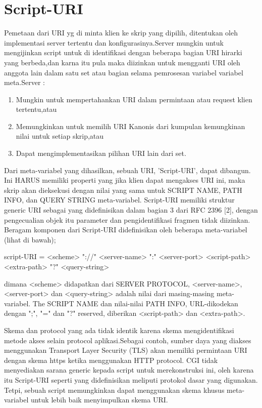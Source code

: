 \documentclass{article}
\begin{document}
\section{Script-URI}
Pemetaan dari URI yg di minta klien ke skrip yang dipilih, ditentukan oleh
implementasi server tertentu dan konfigurasinya.Server mungkin untuk mengijinkan script untuk di identifikasi dengan beberapa bagian URI hirarki yang berbeda,dan karna itu pula maka diizinkan untuk mengganti URI oleh anggota lain dalam satu set atau bagian selama pemrosesan variabel variabel meta.Server :
\begin{enumerate}
\item Mungkin untuk mempertahankan URI dalam permintaan atau request klien tertentu,atau
\item Memungkinkan untuk memilih URI Kanonis dari kumpulan kemungkinan nilai untuk setiap skrip,atau
\item Dapat mengimplementasikan pilihan URI lain dari set.
\end{enumerate}
Dari meta-variabel yang dihasilkan, sebuah URI, 'Script-URI', dapat
dibangun. Ini HARUS memiliki properti yang jika klien dapat
mengakses URI ini, maka skrip akan dieksekusi
dengan nilai yang sama untuk SCRIPT NAME, PATH INFO, dan QUERY STRING
meta-variabel. Script-URI memiliki struktur generic URI sebagai yang
didefinisikan dalam bagian 3 dari RFC 2396 [2], dengan pengecualian objek itu
parameter dan pengidentifikasi fragmen tidak diizinkan. Beragam
komponen dari Script-URI didefinisikan oleh beberapa
meta-variabel (lihat di bawah);

	script-URI = <scheme> "://" <server-name> ":" <server-port>
             	 <script-path> <extra-path> "?" <query-string>

dimana <scheme> didapatkan dari SERVER PROTOCOL, <server-name>,
<server-port> dan <query-string> adalah nilai dari masing-masing meta-variabel. The SCRIPT NAME dan nilai-nilai PATH INFO, URL-dikodekan dengan ";", "=" dan "?"  reserved, diberikan  <script-path> dan <extra-path>.

Skema dan protocol yang ada tidak identik karena skema mengidentifikasi metode akses selain protocol aplikasi.Sebagai contoh, sumber daya yang diakses menggunakan Transport Layer Security (TLS) akan memiliki permintaan URI dengan skema https ketika menggunakan HTTP protocol. CGI tidak menyediakan sarana generic kepada script untuk merekonstruksi ini, oleh karena itu Script-URI seperti yang didefinisikan meliputi protokol dasar yang digunakan. Tetpi, sebuah script memungkinkan dapat menggunakan skema khusus meta-variabel untuk lebih baik menyimpulkan skema URI.
\end{document}

